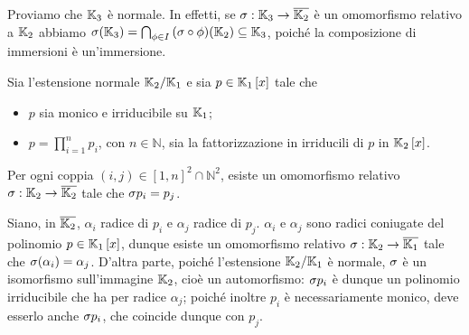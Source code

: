 \par Proviamo che $\mathbb{K}_3$ \`e normale. In effetti, se $\sigma: \mathbb{K}_3 \rightarrow \overline{\mathbb{K}_2}$ \`e un omomorfismo relativo a $\mathbb{K}_2$ abbiamo $\sigma(\mathbb{K}_3) = \bigcap_{\phi \in I}{(\sigma \circ \phi)(\mathbb{K}_2)} \subseteq \mathbb{K}_3$, poich\'e la composizione di immersioni \`e un'immersione.
\begin{Exercice}
	Sia l'estensione normale $\mathbb{K}_2/\mathbb{K}_1$ e sia $p \in \mathbb{K}_1 \left [ x \right ]$ tale che
	\begin{itemize}
		\item $p$ sia monico e irriducibile su $\mathbb{K}_1$;
		\item $p = \prod_{i = 1}^n p_i$, con $n \in \mathbb{N}$, sia la fattorizzazione in irriducili di $p$ in $\mathbb{K}_2 \left [ x \right ]$.
	\end{itemize}
	Per ogni coppia $(i,j) \in [1,n]^2 \cap \mathbb{N}^2$, esiste un omomorfismo relativo $\sigma: \mathbb{K}_2 \rightarrow \overline{\mathbb{K}_2}$ tale che ${\sigma}{p_i} = p_j$.
\end{Exercice}
\Solution Siano, in $\overline{\mathbb{K}_2}$, $\alpha_i$ radice di $p_i$ e $\alpha_j$ radice di $p_j$. $\alpha_i$ e $\alpha_j$ sono radici coniugate del polinomio $p \in \mathbb{K}_1 \left [ x \right ]$, dunque esiste un omomorfismo relativo $\sigma: \mathbb{K}_2 \rightarrow \overline{\mathbb{K}_1}$ tale che $\sigma(\alpha_i) = \alpha_j$. D'altra parte, poich\'e l'estensione $\mathbb{K}_2/\mathbb{K}_1$ \`e normale, $\sigma$ \`e un isomorfismo sull'immagine $\mathbb{K}_2$, cio\`e un automorfismo: ${\sigma}{p_i}$ \`e dunque un polinomio irriducibile che ha per radice $\alpha_j$; poich\'e inoltre $p_i$ \`e necessariamente monico, deve esserlo anche ${\sigma}{p_i}$, che coincide dunque con $p_j$. \EndProof

